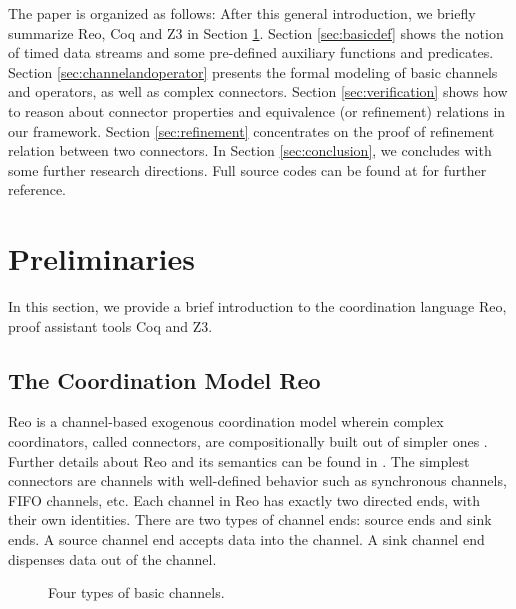 \documentclass[3p,times]{elsarticle}
\begin{document}
The paper is organized as follows: After this general introduction, we briefly summarize Reo, Coq and Z3
in Section \ref{sec:pre}. Section \ref{sec:basicdef} shows the notion of timed data streams and some
pre-defined auxiliary functions and predicates. Section \ref{sec:channelandoperator} presents the
formal modeling of basic channels and operators, as well as complex connectors. Section
\ref{sec:verification} shows how to reason about connector properties and equivalence (or
refinement) relations in our framework. Section \ref{sec:refinement} concentrates on the proof of refinement relation between two connectors.
In Section \ref{sec:conclusion}, we concludes with some further research directions. Full source codes can be found at \cite{reo2coqfile} for further reference.

\section{Preliminaries}\label{sec:pre}

In this section, we provide a brief introduction to the coordination language Reo, proof assistant tools Coq and Z3.

\subsection{The Coordination Model Reo}
Reo is a channel-based exogenous coordination model wherein complex coordinators, called connectors,
are compositionally built out of simpler ones \cite{Arb04}.
Further details about Reo and its semantics can be found in \cite{Arb04,AR03,BSAR06}.
The simplest connectors are channels with well-defined behavior such as synchronous channels, FIFO channels, etc.
Each channel in Reo has exactly two directed ends, with their own identities.
There are two types of channel ends: source ends and sink ends. A source channel end accepts
data into the channel. A sink channel end dispenses data out of the channel.
\begin{figure}
  \centering
  \vspace{-6mm}
  \caption{Four types of basic channels.}\label{fig:basicchannel}
\end{figure}
\end{document}
